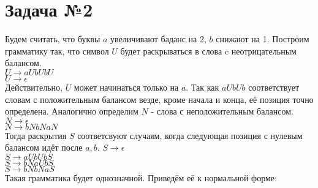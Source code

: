 \documentclass{article}
\begin{document}
    \section{Задача №2}
    Будем считать, что буквы $a$ увеличивают баданс на 2, $b$ снижают на 1.
    Построим грамматику так, что символ $U$ будет раскрываться в слова c неотрицательным балансом.\\
    $ U \to aUbUbU $\\
    $ U \to \epsilon $\\
    Действительно, $U$ может начинаться только на $a$. Так как $aUbUb$ соответствует словам с положительным балансом
    везде, кроме начала и конца, её позиция точно определена. Аналогично определим $N$ - слова с неположительным балансом.
    $ N \to \epsilon $\\
    $ N \to bNbNaN $\\
    Тогда раскрытия $S$ соответсвуют случаям, когда следующая позиция с нулевым балансом идёт после $a, b$.
    $ S \to \epsilon $\\
    $ S \to aUbUbS $\\
    $ S \to bNaUbS $\\
    $ S \to bNbNaS $\\
    Такая грамматика будет однозначной. Приведём её к нормальной форме:
\end{document}
